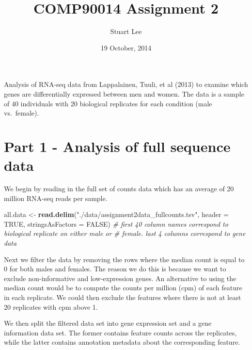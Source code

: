 \documentclass[]{article}
\title{COMP90014 Assignment 2}
\author{Stuart Lee}
\date{19 October, 2014}
\newenvironment{Shaded}{\begin{snugshade}}{\end{snugshade}}
\newcommand{\KeywordTok}[1]{\textcolor[rgb]{0.13,0.29,0.53}{\textbf{{#1}}}}
\newcommand{\DataTypeTok}[1]{\textcolor[rgb]{0.13,0.29,0.53}{{#1}}}
\newcommand{\StringTok}[1]{\textcolor[rgb]{0.31,0.60,0.02}{{#1}}}
\newcommand{\CommentTok}[1]{\textcolor[rgb]{0.56,0.35,0.01}{\textit{{#1}}}}
\newcommand{\OtherTok}[1]{\textcolor[rgb]{0.56,0.35,0.01}{{#1}}}
\newcommand{\NormalTok}[1]{{#1}}
\begin{document}
\maketitle


Analysis of RNA-seq data from Lappalainen, Tuuli, et al (2013) to
examine which genes are differentially expressed between men and women.
The data is a sample of 40 individuals with 20 biological replicates for
each condition (male vs.~female).

\section{Part 1 - Analysis of full sequence
data}\label{part-1---analysis-of-full-sequence-data}

We begin by reading in the full set of counts data which has an average
of 20 million RNA-seq reads per sample.

\begin{Shaded}
\begin{Highlighting}[]
\NormalTok{all.data <-}\StringTok{ }\KeywordTok{read.delim}\NormalTok{(}\StringTok{"./data/assignment2data_fullcounts.tsv"}\NormalTok{, }\DataTypeTok{header =} \OtherTok{TRUE}\NormalTok{, }
    \DataTypeTok{stringsAsFactors =} \OtherTok{FALSE}\NormalTok{)}
\CommentTok{# first 40 column names correspond to biological replicate on either male or}
\CommentTok{# female. last 4 columns correspond to gene data}
\end{Highlighting}
\end{Shaded}

Next we filter the data by removing the rows where the median count is
equal to 0 for both males and females. The reason we do this is because
we want to exclude non-informative and low-expression genes. An
alternative to using the median count would be to compute the counts per
million (cpm) of each feature in each replicate. We could then exclude
the features where there is not at least 20 replicates with cpm above 1.

We then split the filtered data set into gene expression set and a gene
information data set. The former contains feature counts across the
replicates, while the latter contains annotation metadata about the
corresponding feature.
\end{document}
